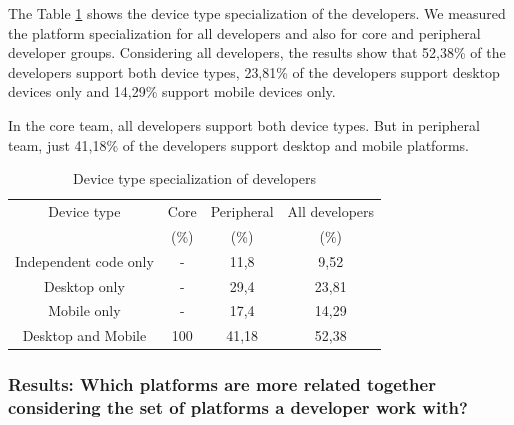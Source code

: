 \documentclass[10pt, conference]{IEEEtran}
\begin{document}
The Table \ref{devicetype} shows the device type specialization of the  developers. We measured the platform specialization for all developers and also for core and peripheral developer groups. Considering all developers, the results show that 52,38\%  of the developers support both device types, 23,81\% of the developers support desktop devices only and 14,29\% support mobile devices only.

In the core team, all developers support both device types. But in peripheral team, just 41,18\% of the developers support desktop and mobile platforms.       


\begin{table}[h]
\renewcommand{\arraystretch}{1.3}
\caption{Device type specialization of developers}
\label{devicetype}
\centering
\begin{tabular}{|c|c|c|c|}
\hline
 Device type & Core   & Peripheral &All developers \\
  &  (\%)   &  (\%) &  (\%)\\
\hline
Independent code only & 		- & 		11,8  & 	9,52\\
\hline
Desktop only & 					- & 		29,4  & 	23,81\\
\hline
Mobile only & 					- & 		17,4  & 	14,29\\
\hline
Desktop and Mobile & 			100 & 		41,18 & 	52,38	\\
\hline

\end{tabular}
\end{table} 




\subsubsection{Results: Which platforms are more related together considering the set of platforms a developer work with? }
\end{document}
